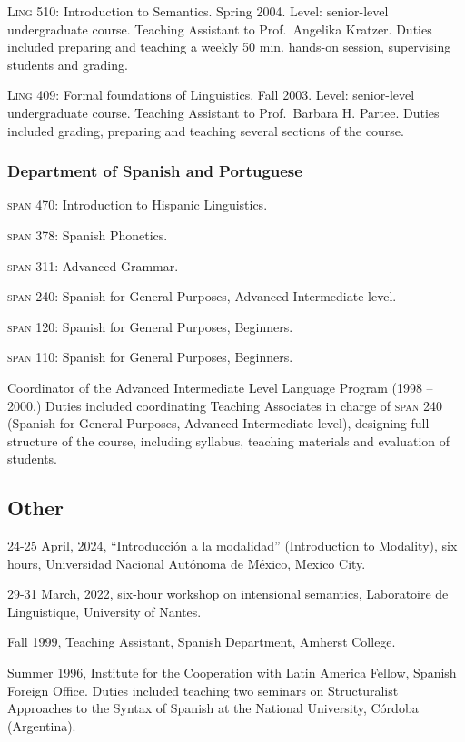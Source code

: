 \documentclass[11pt]{article}
\begin{document}
\textsc{Ling 510:} Introduction to Semantics. Spring 2004. Level:
senior-level undergraduate course. Teaching Assistant to Prof.\
Angelika Kratzer. Duties included preparing and teaching a weekly 50 min. hands-on session, supervising students and grading.

\textsc{Ling 409:} Formal foundations of Linguistics. Fall
2003. Level: senior-level undergraduate course. Teaching Assistant to
Prof.\ Barbara H. Partee. Duties included grading, preparing and teaching several sections of the course. 

\subsubsection*{Department of Spanish and Portuguese}

\textsc{span 470}: Introduction to Hispanic Linguistics.

\textsc{span 378}: Spanish Phonetics. 

\textsc{span 311}: Advanced Grammar. 

\textsc{span 240}: Spanish for General Purposes, Advanced Intermediate level.

\textsc{span 120}:  Spanish for General Purposes, Beginners.

 \textsc{span 110}: Spanish for General Purposes, Beginners.


 Coordinator of the Advanced Intermediate Level Language Program (1998
 -- 2000.) Duties included coordinating Teaching Associates in charge
 of \textsc{span} 240 (Spanish for General Purposes, Advanced
 Intermediate level), designing full structure of the course,
 including syllabus, teaching materials and evaluation of students.

\subsection*{\textbf{Other}}


24-25 April, 2024, ``Introducci\'on a la modalidad'' (Introduction to Modality), six hours, Universidad Nacional Aut\'onoma de M\'exico, Mexico City.

29-31 March, 2022, six-hour workshop on intensional semantics, Laboratoire de Linguistique, University of Nantes. 

Fall 1999, Teaching Assistant, Spanish Department, Amherst College.

Summer 1996,  Institute for the Cooperation with Latin America Fellow,  Spanish Foreign Office. Duties included teaching two seminars on Structuralist Approaches to the Syntax of Spanish at the National University, C\'ordoba (Argentina).
\end{document}
